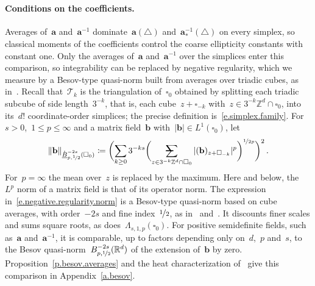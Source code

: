 \documentclass[11pt,letterpaper]{article}
\makeatletter
\numberwithin{equation}{section}
\theoremstyle{definition}
\newcommand{\Rd}{\mathbb{R}^d}
\newcommand{\Zd}{\mathbb{Z}^d}
\renewcommand{\a}{\mathbf{a}}
\newcommand{\nf}{\nicefrac}
\newcommand{\cu}{\square}
\DeclarePairedDelimiter{\norm}{\lVert}{\rVert}
\newcommand{\avsum}{\mathop{\mathpalette\avsuminner\relax}\displaylimits}
\newcommand\avsuminner[2]{%
	{\sbox0{$\m@th#1\sum$}%
		\vphantom{\usebox0}%
		\ooalign{%
			\hidewidth
			\smash{\,\rule[.23em]{8.8pt}{1.1pt} \relax}%
			\hidewidth\cr
			$\m@th#1\sum$\cr
		}%
	}%
}
\makeatother
\begin{document}
\paragraph{Conditions on the coefficients.} Averages of~$\a$ and~$\a^{-1}$ dominate~$\a(\triangle)$ and~$\a_*^{-1}(\triangle)$ on every simplex, so classical moments of the coefficients control the coarse ellipticity constants with constant one. Only the averages of~$\a$ and~$\a^{-1}$ over the simplices enter this comparison, so integrability can be replaced by negative regularity, which we measure by a Besov-type quasi-norm built from averages over triadic cubes, as in~\cite{AK.HC,AADKM}. Recall that~$\mathscr T_k$ is the triangulation of~$\cu_0$ obtained by splitting each triadic subcube of side length~$3^{-k}$, that is, each cube~$z+\cu_{-k}$ with~$z\in3^{-k}\Zd\cap\cu_0$, into its~$d!$ coordinate-order simplices; the precise definition is~\eqref{e.simplex.family}. For~$s>0$,~$1\leq p\leq\infty$ and a matrix field~$\mathbf b$ with~$|\mathbf b|\in L^1(\cu_0)$, let
\begin{equation}
	\norm{\mathbf b}_{\mathring{\underline B}^{-2s}_{p,\nf12}(\cu_0)}\coloneqq\biggl(\sum_{k\geq0}3^{-ks}\biggl(\avsum_{z\in3^{-k}\Zd\cap\cu_0}|(\mathbf b)_{z+\cu_{-k}}|^p\biggr)^{\nf1{2p}}\biggr)^2\,.
	\label{e.negative.regularity.norm}
\end{equation}
For~$p=\infty$ the mean over~$z$ is replaced by the maximum. Here and below, the~$L^p$ norm of a matrix field is that of its operator norm. The expression in~\eqref{e.negative.regularity.norm} is a Besov-type quasi-norm based on cube averages, with order~$-2s$ and fine index~$\nf12$, as in~\cite[Section~2.4]{AK.HC} and~\cite[Section~2.2]{AADKM}. It discounts finer scales and sums square roots, as does~$\Lambda_{s,1,p}(\cu_0)$. For positive semidefinite fields, such as~$\a$ and~$\a^{-1}$, it is comparable, up to factors depending only on~$d$,~$p$ and~$s$, to the Besov quasi-norm~$B^{-2s}_{p,\nf12}(\Rd)$ of the extension of~$\mathbf b$ by zero. Proposition~\ref{p.besov.averages} and the heat characterization of~\cite[Definition~6.1 and Theorem~6.7]{Kerkyacharian.Petrushev} give this comparison in Appendix~\ref{a.besov}.
\end{document}
